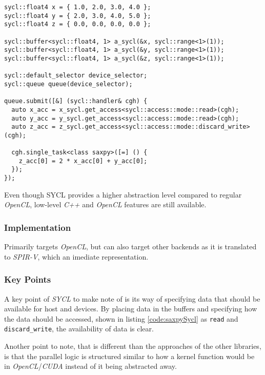 \begin{lstlisting}[caption={Saxpy implemented in SYCL}, label={code:saxpySycl}]
sycl::float4 x = { 1.0, 2.0, 3.0, 4.0 };
sycl::float4 y = { 2.0, 3.0, 4.0, 5.0 };
sycl::float4 z = { 0.0, 0.0, 0.0, 0.0 };

sycl::buffer<sycl::float4, 1> a_sycl(&x, sycl::range<1>(1));
sycl::buffer<sycl::float4, 1> a_sycl(&y, sycl::range<1>(1));
sycl::buffer<sycl::float4, 1> a_sycl(&z, sycl::range<1>(1));

sycl::default_selector device_selector;
sycl::queue queue(device_selector);

queue.submit([&] (sycl::handler& cgh) {
  auto x_acc = x_sycl.get_access<sycl::access::mode::read>(cgh);
  auto y_acc = y_sycl.get_access<sycl::access::mode::read>(cgh);
  auto z_acc = z_sycl.get_access<sycl::access::mode::discard_write>(cgh);

  cgh.single_task<class saxpy>([=] () {
    z_acc[0] = 2 * x_acc[0] + y_acc[0];
  });
});
\end{lstlisting}

Even though SYCL provides a higher abstraction level compared to regular \textit{OpenCL}, low-level \textit{C++} and \textit{OpenCL} features are still available.

\subsubsection{Implementation}
Primarily targets \textit{OpenCL}, but can also target other backends as it is translated to \textit{SPIR-V}, which an imediate representation.

\subsubsection{Key Points}
A key point of \textit{SYCL} to make note of is its way of specifying data that should be available for host and devices. By placing data in the buffers and specifying how the data should be accessed, shown in listing \ref{code:saxpySycl} as \texttt{read} and \texttt{discard\_write}, the availability of data is clear. 

Another point to note, that is different than the approaches of the other libraries, is that the parallel logic is structured similar to how a kernel function would be in \textit{OpenCL}/\textit{CUDA} instead of it being abstracted away.


